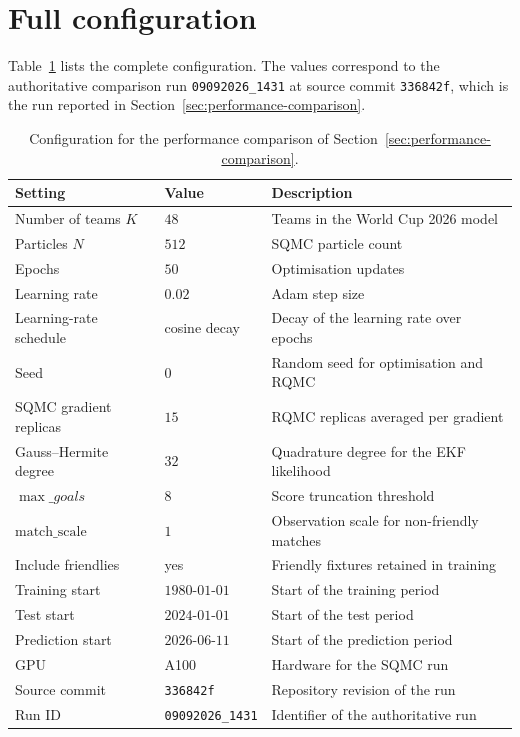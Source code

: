\section{Full configuration}

Table~\ref{tab:config} lists the complete configuration. The values correspond to the authoritative comparison run \texttt{09092026\_1431} at source commit \texttt{336842f}, which is the run reported in Section~\ref{sec:performance-comparison}.

\begin{table}[H]
\centering
\begin{tabularx}{\textwidth}{lXX}
\toprule
Setting & Value & Description \\
\midrule
Number of teams $K$ & $48$ & Teams in the World Cup 2026 model \\
Particles $N$ & $512$ & SQMC particle count \\
Epochs & $50$ & Optimisation updates \\
Learning rate & $0.02$ & Adam step size \\
Learning-rate schedule & cosine decay & Decay of the learning rate over epochs \\
Seed & $0$ & Random seed for optimisation and RQMC \\
SQMC gradient replicas & $15$ & RQMC replicas averaged per gradient \\
Gauss--Hermite degree & $32$ & Quadrature degree for the EKF likelihood \\
$\max\_goals$ & $8$ & Score truncation threshold \\
$\text{match\_scale}$ & $1$ & Observation scale for non-friendly matches \\
Include friendlies & yes & Friendly fixtures retained in training \\
Training start & $1980\text{-}01\text{-}01$ & Start of the training period \\
Test start & $2024\text{-}01\text{-}01$ & Start of the test period \\
Prediction start & $2026\text{-}06\text{-}11$ & Start of the prediction period \\
GPU & A100 & Hardware for the SQMC run \\
Source commit & \texttt{336842f} & Repository revision of the run \\
Run ID & \texttt{09092026\_1431} & Identifier of the authoritative run \\
\bottomrule
\end{tabularx}
\caption{Configuration for the performance comparison of Section~\ref{sec:performance-comparison}.}
\label{tab:config}
\end{table}
